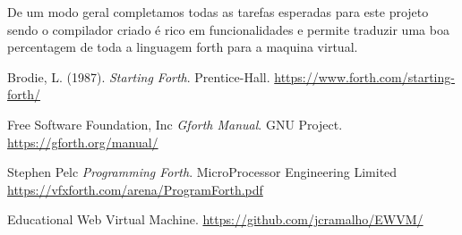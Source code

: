 \documentclass{article}
\begin{document}
De um modo geral completamos todas as tarefas esperadas para este projeto sendo o compilador criado é rico em funcionalidades e permite traduzir uma boa percentagem de toda a linguagem forth para a maquina virtual.


\begin{thebibliography}{9}

Brodie, L. (1987).
\textit{Starting Forth}.
Prentice-Hall.
\url{https://www.forth.com/starting-forth/}

Free Software Foundation, Inc
\textit{Gforth Manual}.
GNU Project.
\url{https://gforth.org/manual/}

Stephen Pelc
\textit{Programming Forth}.
MicroProcessor Engineering Limited
\url{https://vfxforth.com/arena/ProgramForth.pdf}

Educational Web Virtual Machine.
\url{https://github.com/jcramalho/EWVM/}

\end{thebibliography}
\end{document}
